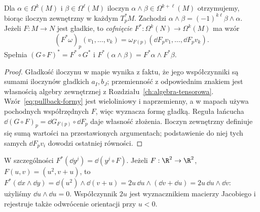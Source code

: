 \begin{stwierdzenie}
\label{prop:formy-wedge-pullback}
Dla $\alpha\in\Omega^k(M)$ i $\beta\in\Omega^\ell(M)$
iloczyn $\alpha\wedge\beta\in\Omega^{k+\ell}(M)$
otrzymujemy, biorąc iloczyn zewnętrzny w każdym
$T_p^*M$. Zachodzi $\alpha\wedge\beta
=(-1)^{k\ell}\beta\wedge\alpha$.
Jeżeli $F:M\to N$ jest gładkie, to \emph{cofnięcie}
$F^*:\Omega^k(N)\to\Omega^k(M)$ ma wzór
\begin{equation}\label{eq:pullback-formy}
 (F^*\omega)_p(v_1,\ldots,v_k)
 =\omega_{F(p)}(\dd F_pv_1,\ldots,\dd F_pv_k).
\end{equation}
Spełnia $(G\circ F)^*=F^*\circ G^*$ i
$F^*(\alpha\wedge\beta)=F^*\alpha\wedge F^*\beta$.
\end{stwierdzenie}
\begin{proof}
Gładkość iloczynu w mapie wynika z faktu, że jego
współczynniki są sumami iloczynów gładkich $a_I,b_J$;
przemienność z odpowiednim znakiem jest własnością
algebry zewnętrznej z Rozdziału~\ref{ch:algebra-tensorowa}.
Wzór~\eqref{eq:pullback-formy} jest wieloliniowy i
naprzemienny, a w mapach używa pochodnych współrzędnych
$F$, więc wyznacza formę gładką. Reguła łańcucha
$\dd(G\circ F)_p=\dd G_{F(p)}\circ\dd F_p$
daje własność złożenia. Iloczyn zewnętrzny definiuje
się sumą wartości na przestawionych argumentach; podstawienie
do niej tych samych $\dd F_pv_i$ dowodzi ostatniej równości.
\end{proof}

W szczególności $F^*(\dd y^j)=\dd(y^j\circ F)$.
Jeżeli $F:\R^2\to\R^2$, $F(u,v)=(u^2,v+u)$,
to $F^*(\dd x\wedge\dd y)
=\dd(u^2)\wedge\dd(v+u)
=2u\,\dd u\wedge(\dd v+\dd u)=2u\,\dd u\wedge\dd v$:
użyliśmy $\dd u\wedge\dd u=0$.
Współczynnik $2u$ jest wyznacznikiem macierzy Jacobiego
i rejestruje także odwrócenie orientacji przy $u<0$.

